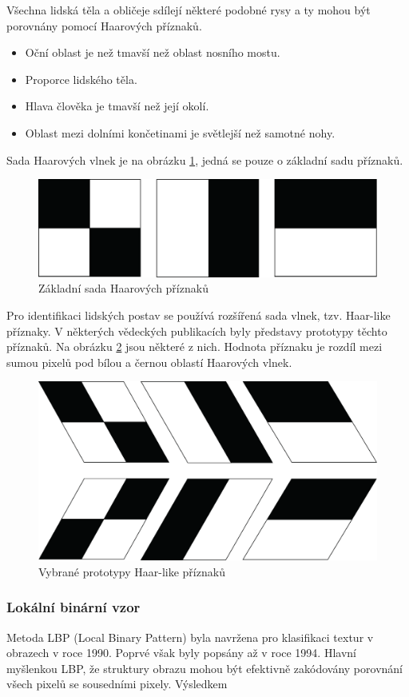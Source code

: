Všechna lidská těla a obličeje sdílejí některé podobné rysy a ty mohou být porovnány pomocí Haarových příznaků.
\begin{itemize}
  \item{Oční oblast je než tmavší než oblast nosního mostu.}
  \item{Proporce lidského těla.}
  \item{Hlava člověka je tmavší než její okolí.}
  \item{Oblast mezi dolními končetinami je světlejší než samotné nohy.}
\end{itemize}
Sada Haarových vlnek je na obrázku \ref{fig:basichaarfeatures}, jedná se pouze o základní sadu příznaků.
\begin{figure}[H]
\centering
\includegraphics[width=.7\linewidth]{figures/haar_features}
\caption{Základní sada Haarových příznaků}
\label{fig:basichaarfeatures}
\end{figure}

Pro identifikaci lidských postav se používá rozšířená sada vlnek, tzv. Haar-like příznaky. V některých vědeckých publikacích byly představy prototypy těchto příznaků. Na obrázku \ref{fig:haarlike} jsou některé z nich. Hodnota příznaku je rozdíl mezi sumou pixelů pod bílou a černou oblastí Haarových vlnek.
\begin{figure}[H]
\centering
\includegraphics[width=.6\linewidth]{figures/haar_like}
\caption{Vybrané prototypy Haar-like příznaků}
\label{fig:haarlike}
\end{figure}

\subsubsection*{Lokální binární vzor} %
Metoda LBP (Local Binary Pattern) byla navržena pro klasifikaci textur v obrazech v roce 1990. \cite{lbp:texture} Poprvé však byly popsány až v roce 1994. \cite{lbp:first} Hlavní myšlenkou LBP, že struktury obrazu mohou být efektivně zakódovány porovnání všech pixelů se sousedními pixely. Výsledkem

